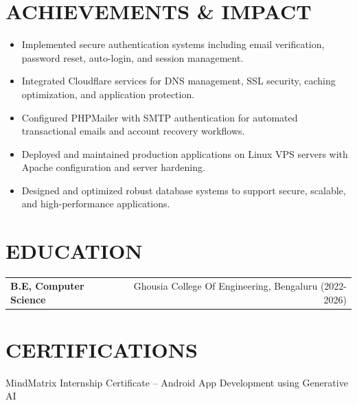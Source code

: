 \documentclass[10pt,a4paper]{article}
\begin{document}
\section*{ACHIEVEMENTS \& IMPACT}

\begin{itemize}
\item Implemented secure authentication systems including email verification, password reset, auto-login, and session management.
\item Integrated Cloudflare services for DNS management, SSL security, caching optimization, and application protection.
\item Configured PHPMailer with SMTP authentication for automated transactional emails and account recovery workflows.
\item Deployed and maintained production applications on Linux VPS servers with Apache configuration and server hardening.
\item Designed and optimized robust database systems to support secure, scalable, and high-performance applications.
\end{itemize}


\section*{EDUCATION}

\begin{tabularx}{\textwidth}{Xr}
\textbf{B.E, Computer Science}
&
Ghousia College Of Engineering, Bengaluru (2022-2026)
\end{tabularx}


\section*{CERTIFICATIONS}

MindMatrix Internship Certificate -- Android App Development using Generative AI
\end{document}
